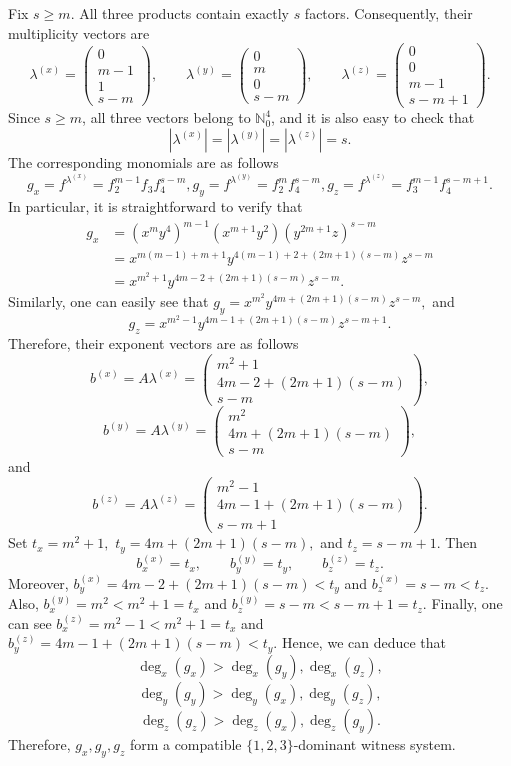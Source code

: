 \documentclass[11pt]{amsart}   %
\begin{document}
\begin{exm}
 Fix  $s\geq m$.  All three products contain exactly $s$ factors.  Consequently, their multiplicity vectors are
\[
\lambda^{(x)}
=
\begin{pmatrix}
0\\
m-1\\
1\\
s-m
\end{pmatrix},
\qquad
\lambda^{(y)}
=
\begin{pmatrix}
0\\
m\\
0\\
s-m
\end{pmatrix},
\qquad
\lambda^{(z)}
=
\begin{pmatrix}
0\\
0\\
m-1\\
s-m+1
\end{pmatrix}.
\]
Since $s\geq m$, all three vectors belong to $\mathbb{N}_0^4$, and  it is also easy to check that
\[
\left|\lambda^{(x)}\right|
=
\left|\lambda^{(y)}\right|
=
\left|\lambda^{(z)}\right|
=s.
\]
The corresponding monomials are as follows
$$g_x=f^{\lambda^{(x)}}=f_2^{m-1}f_3f_4^{s-m}, g_y=f^{\lambda^{(y)}}=f_2^mf_4^{s-m},
 g_z=f^{\lambda^{(z)}}=f_3^{m-1}f_4^{s-m+1}.$$
In particular, it  is straightforward to verify that
\[
\begin{aligned}
g_x
&=(x^my^4)^{m-1}
  (x^{m+1}y^2)
  (y^{2m+1}z)^{s-m}\\
&=x^{m(m-1)+m+1}
  y^{4(m-1)+2+(2m+1)(s-m)}
  z^{s-m}\\
&=x^{m^2+1}
  y^{4m-2+(2m+1)(s-m)}
  z^{s-m}.
\end{aligned}
\]
Similarly, one can easily see that $g_y
=x^{m^2}
y^{4m+(2m+1)(s-m)}
z^{s-m},$ and
$$g_z
=x^{m^2-1}
y^{4m-1+(2m+1)(s-m)}
z^{s-m+1}.$$
Therefore, their exponent vectors are as follows
\[
b^{(x)}
=A\lambda^{(x)}
=
\begin{pmatrix}
m^2+1\\
4m-2+(2m+1)(s-m)\\
s-m
\end{pmatrix},
\]
\[
b^{(y)}
=A\lambda^{(y)}
=
\begin{pmatrix}
m^2\\
4m+(2m+1)(s-m)\\
s-m
\end{pmatrix},
\]
and
\[
b^{(z)}
=A\lambda^{(z)}
=
\begin{pmatrix}
m^2-1\\
4m-1+(2m+1)(s-m)\\
s-m+1
\end{pmatrix}.
\]
Set  $t_x=m^2+1,$ $t_y=4m+(2m+1)(s-m),$ and $t_z=s-m+1.$ Then
\[
b_x^{(x)}=t_x,\qquad
b_y^{(y)}=t_y,\qquad
b_z^{(z)}=t_z.
\]
Moreover, $b_y^{(x)} =4m-2+(2m+1)(s-m)<t_y$ and $b_z^{(x)}=s-m<t_z.$ Also,
 $b_x^{(y)}=m^2<m^2+1=t_x$  and  $b_z^{(y)}=s-m<s-m+1=t_z.$ Finally, one can see
 $b_x^{(z)}=m^2-1<m^2+1=t_x$ and $b_y^{(z)}=4m-1+(2m+1)(s-m)<t_y.$
  Hence,  we can deduce that
 \[
 \deg_x(g_x)>\deg_x(g_y),\deg_x(g_z),
\]
\[
\deg_y(g_y)>\deg_y(g_x),\deg_y(g_z),
\]
\[
\deg_z(g_z)>\deg_z(g_x),\deg_z(g_y).
\]
Therefore, $g_x,g_y,g_z$ form a compatible $\{1,2,3\}$-dominant witness system.


\end{exm}
\end{document}
